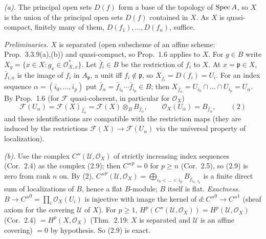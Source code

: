 \documentclass[11pt]{article}
\begin{document}
\pf
\emph{(a).} The principal open sets $D(f)$ form a base of the topology of $\operatorname{Spec} A$, so $X$ is the union of the principal open sets $D(f)$ contained in $X$. As $X$ is quasi-compact, finitely many of them, $D(f_1),\dots,D(f_n)$, suffice.

\emph{Preliminaries.} $X$ is separated (open subscheme of an affine scheme: Prop.~3.3.9(a),(b)) and quasi-compact, so Prop.~1.6 applies to $X$. For $g\in B$ write $X_g=\{x\in X:g_x\in\mathcal O_{X,x}^*\}$. Let $\bar f_i\in B$ be the restriction of $f_i$ to $X$. At $x=\mathfrak p\in X$, $\bar f_{i,x}$ is the image of $f_i$ in $A_{\mathfrak p}$, a unit iff $f_i\notin\mathfrak p$, so $X_{\bar f_i}=D(f_i)=U_i$. For an index sequence $\alpha=(i_0,\dots,i_p)$ put $\bar f_\alpha=\bar f_{i_0}\cdots\bar f_{i_p}\in B$; then $X_{\bar f_\alpha}=U_{i_0}\cap\dots\cap U_{i_p}=U_\alpha$. By Prop.~1.6 (for $\mathcal F$ quasi-coherent, in particular for $\mathcal O_X$)
\[ \mathcal F(U_\alpha)=\mathcal F(X)_{\bar f_\alpha}=\mathcal F(X)\otimes_BB_{\bar f_\alpha},\qquad\mathcal O_X(U_\alpha)=B_{\bar f_\alpha},\qquad(2) \]
and these identifications are compatible with the restriction maps (they are induced by the restrictions $\mathcal F(X)\to\mathcal F(U_\alpha)$ via the universal property of localization).

\emph{(b).} Use the complex $C''(\mathcal U,\mathcal O_X)$ of strictly increasing index sequences (Cor.~2.4) as the complex (2.9); then $C''^p=0$ for $p\ge n$ (Cor.~2.5), so (2.9) is zero from rank $n$ on. By (2), $C''^p(\mathcal U,\mathcal O_X)=\bigoplus_{i_0<\dots<i_p}B_{\bar f_{i_0\dots i_p}}$ is a finite direct sum of localizations of $B$, hence a flat $B$-module; $B$ itself is flat. \emph{Exactness.} $B\to C''^0=\prod_i\mathcal O_X(U_i)$ is injective with image the kernel of $d:C''^0\to C''^1$ (sheaf axiom for the covering $\mathcal U$ of $X$). For $p\ge1$, $H^p(C''(\mathcal U,\mathcal O_X))=H^p(\mathcal U,\mathcal O_X)$ (Cor.~2.4) $=H^p(X,\mathcal O_X)$ (Thm.~2.19: $X$ is separated and $\mathcal U$ is an affine covering) $=0$ by hypothesis. So (2.9) is exact.
\end{document}
